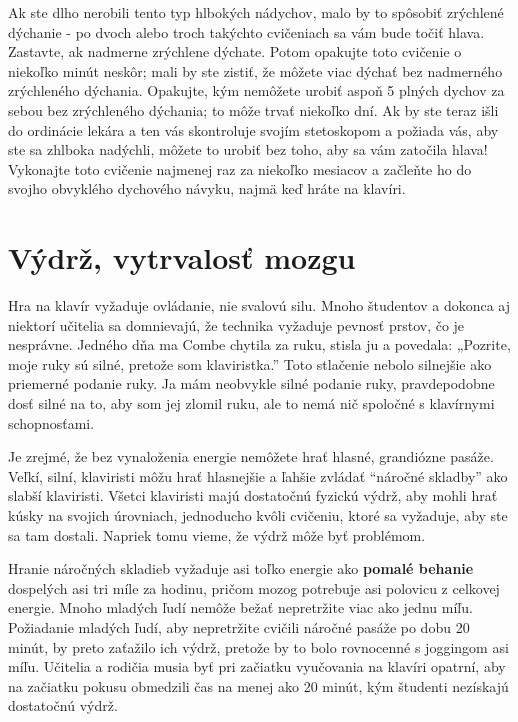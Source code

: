 \documentclass[11pt,a4paper]{book}
\begin{document}
Ak ste dlho nerobili tento typ hlbokých nádychov, malo by to spôsobiť zrýchlené dýchanie - po dvoch alebo troch takýchto cvičeniach sa vám bude točiť hlava. Zastavte, ak nadmerne zrýchlene dýchate. Potom opakujte toto cvičenie o niekoľko minút neskôr; mali by ste zistiť, že môžete viac dýchať bez nadmerného zrýchleného dýchania. Opakujte, kým nemôžete urobiť aspoň 5 plných dychov za sebou bez zrýchleného dýchania; to môže trvať niekoľko dní. Ak by ste teraz išli do ordinácie lekára a ten vás skontroluje svojím stetoskopom a požiada vás, aby ste sa zhlboka nadýchli, môžete to urobiť bez toho, aby sa vám zatočila hlava! Vykonajte toto cvičenie najmenej raz za niekoľko mesiacov a začleňte ho do svojho obvyklého dychového návyku, najmä keď hráte na klavíri.

\section{Výdrž, vytrvalosť mozgu}\label{s:endurance}
Hra na klavír vyžaduje ovládanie, nie svalovú silu. Mnoho študentov a dokonca aj niektorí učitelia sa domnievajú, že technika vyžaduje pevnosť prstov, čo je nesprávne. Jedného dňa ma Combe chytila za ruku, stisla ju a povedala: „Pozrite, moje ruky sú silné, pretože som klaviristka.” Toto stlačenie nebolo silnejšie ako priemerné podanie ruky. Ja mám neobvykle silné podanie ruky, pravdepodobne dosť silné na to, aby som jej zlomil ruku, ale to nemá nič spoločné s klavírnymi schopnosťami.

Je zrejmé, že bez vynaloženia energie nemôžete hrať hlasné, grandiózne pasáže. Veľkí, silní, klaviristi môžu hrať hlasnejšie a ľahšie zvládať “náročné skladby” ako slabší klaviristi. Všetci klaviristi majú dostatočnú fyzickú výdrž, aby mohli hrať kúsky na svojich úrovniach, jednoducho kvôli cvičeniu, ktoré sa vyžaduje, aby ste sa tam dostali. Napriek tomu vieme, že výdrž môže byť problémom.

Hranie náročných skladieb vyžaduje asi toľko energie ako \textbf{pomalé behanie} dospelých asi tri míle za hodinu, pričom mozog potrebuje asi polovicu z celkovej energie. Mnoho mladých ľudí nemôže bežať nepretržite viac ako jednu míľu. Požiadanie mladých ľudí, aby nepretržite cvičili náročné pasáže po dobu 20 minút, by preto zaťažilo ich výdrž, pretože by to bolo rovnocenné s joggingom asi míľu. Učitelia a rodičia musia byť pri začiatku vyučovania na klavíri opatrní, aby na začiatku pokusu obmedzili čas na menej ako 20 minút, kým študenti nezískajú dostatočnú výdrž. 
\end{document}
